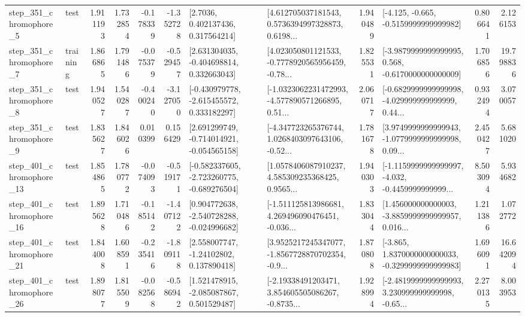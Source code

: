 \begin{tabular}{llrrrrllrlrr}
   step\_351\_chromophore\_5 &      test &      1.911193 &    1.732854 &     -0.178339 & -1.352728 &          [2.7036, 0.402137436, 0.317564214] &  [4.612705037181543, 0.5736394997328873, 0.6198... &       1.940489 &              [-4.125, -0.665, -0.5159999999999982] &            0.806641 &          2.126153 \\
   step\_351\_chromophore\_7 &  training &      1.866865 &    1.791486 &     -0.075379 & -0.529457 &    [2.631304035, -0.404698814, 0.332663043] &  [4.023050801121533, -0.7778920565956459, -0.78... &       1.825531 &  [-3.9879999999999995, 0.568, -0.6170000000000009] &            1.706856 &         19.798836 \\
   step\_351\_chromophore\_8 &      test &      1.940527 &    1.540287 &     -0.400240 & -3.127050 &   [-0.430979778, -2.615455572, 0.333182297] &  [-1.0323062231472993, -4.577890571266895, 0.51... &       2.060717 &  [-0.6829999999999998, -4.029999999999999, 0.44... &            0.932494 &          3.070057 \\
   step\_351\_chromophore\_9 &      test &      1.835627 &    1.846026 &      0.010399 &  0.156429 &   [2.691299749, -0.714014921, -0.054565158] &  [-4.347723265376744, 1.0268403097643106, -0.52... &       1.781678 &  [3.9749999999999943, -1.0779999999999998, 0.09... &            2.450427 &          5.681020 \\
  step\_401\_chromophore\_13 &      test &      1.854865 &    1.780772 &     -0.074093 & -0.519171 &  [-0.582337605, -2.723260775, -0.689276504] &  [1.0578406087910237, 4.585309235368425, 0.9565... &       1.940303 &  [-1.1159999999999997, -4.032, -0.4459999999999... &            8.503094 &          5.934682 \\
  step\_401\_chromophore\_16 &      test &      1.895628 &    1.710486 &     -0.185142 & -1.407122 &   [0.904772638, -2.540728288, -0.024996682] &  [-1.511125813986681, 4.269496090476451, -0.036... &       1.833044 &  [1.456000000000003, -3.8859999999999957, 0.016... &            1.211386 &          1.072772 \\
  step\_401\_chromophore\_21 &      test &      1.844008 &    1.608591 &     -0.235416 & -1.809118 &     [2.558007747, -1.24102802, 0.137890418] &  [3.9525217245347077, -1.8567728870702354, -0.9... &       1.870808 &  [-3.865, 1.8370000000000033, -0.3299999999999983] &            1.696091 &         16.642094 \\
  step\_401\_chromophore\_26 &      test &      1.898077 &    1.815509 &     -0.082568 & -0.586942 &    [1.521478915, -2.085087867, 0.501529487] &  [-2.19338491203471, 3.854605505086267, -0.8735... &       1.928994 &  [-2.4819999999999993, 3.230999999999998, -0.65... &            2.270135 &          8.003953 \\

\end{tabular}
